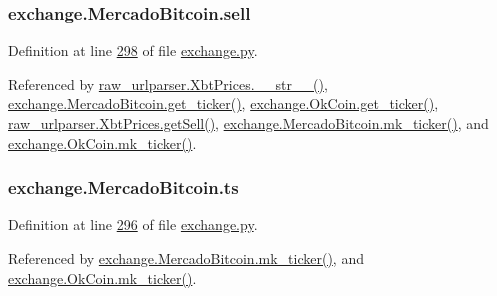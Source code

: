 \subsubsection[{\texorpdfstring{sell}{sell}}]{\setlength{\rightskip}{0pt plus 5cm}exchange.\+Mercado\+Bitcoin.\+sell}\hypertarget{classexchange_1_1_mercado_bitcoin_a9982c7a3f6103c88c64160a5854c35cd}{}\label{classexchange_1_1_mercado_bitcoin_a9982c7a3f6103c88c64160a5854c35cd}


Definition at line \hyperlink{exchange_8py_source_l00298}{298} of file \hyperlink{exchange_8py_source}{exchange.\+py}.



Referenced by \hyperlink{raw__urlparser_8py_source_l00074}{raw\+\_\+urlparser.\+Xbt\+Prices.\+\_\+\+\_\+str\+\_\+\+\_\+()}, \hyperlink{exchange_8py_source_l00306}{exchange.\+Mercado\+Bitcoin.\+get\+\_\+ticker()}, \hyperlink{exchange_8py_source_l00371}{exchange.\+Ok\+Coin.\+get\+\_\+ticker()}, \hyperlink{raw__urlparser_8py_source_l00065}{raw\+\_\+urlparser.\+Xbt\+Prices.\+get\+Sell()}, \hyperlink{exchange_8py_source_l00320}{exchange.\+Mercado\+Bitcoin.\+mk\+\_\+ticker()}, and \hyperlink{exchange_8py_source_l00385}{exchange.\+Ok\+Coin.\+mk\+\_\+ticker()}.

\subsubsection[{\texorpdfstring{ts}{ts}}]{\setlength{\rightskip}{0pt plus 5cm}exchange.\+Mercado\+Bitcoin.\+ts}\hypertarget{classexchange_1_1_mercado_bitcoin_ac4630b08e08f9eeb9dad838dc9dc0cda}{}\label{classexchange_1_1_mercado_bitcoin_ac4630b08e08f9eeb9dad838dc9dc0cda}


Definition at line \hyperlink{exchange_8py_source_l00296}{296} of file \hyperlink{exchange_8py_source}{exchange.\+py}.



Referenced by \hyperlink{exchange_8py_source_l00320}{exchange.\+Mercado\+Bitcoin.\+mk\+\_\+ticker()}, and \hyperlink{exchange_8py_source_l00385}{exchange.\+Ok\+Coin.\+mk\+\_\+ticker()}.

